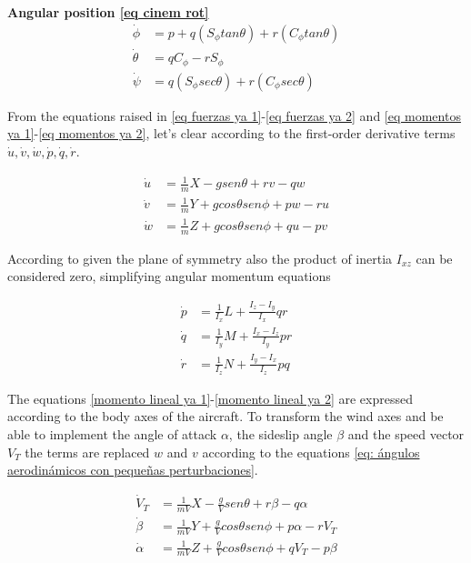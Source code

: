 \textbf{Angular position \ref{eq cinem rot}}
\begin{align}
\label{posi angular 1}
    \dot \phi &= p + q (S_{\phi} tan\theta) + r (C_{\phi} tan\theta)\\
    \dot \theta &=  qC_{\phi} - r S_{\phi}\\
    \dot \psi &= q (S_{\phi} sec\theta) + r (C_{\phi} sec\theta)
\label{posi angular 2}
\end{align}

From the equations raised in \ref{eq fuerzas ya 1}-\ref{eq fuerzas ya 2} and  \ref{eq momentos ya 1}-\ref{eq momentos ya 2}, let's clear according to the first-order derivative terms $\dot u, \dot v, \dot w, \dot p, \dot q, \dot r$.


\begin{align}
\label{momento lineal ya 1}
    \dot u &= \frac{1}{m}X - gsen\theta + rv - qw \\
    \dot v &= \frac{1}{m}Y + gcos\theta sen\phi + pw - ru \\
    \dot w &= \frac{1}{m}Z + gcos\theta sen\phi + qu - pv
\label{momento lineal ya 2}
\end{align}

According to \cite{Mohammad2020} given the plane of symmetry also the product of inertia $I_{xz}$ can be considered zero, simplifying angular momentum equations

\begin{align}
\label{moment angu 1 ya}
    \dot p &= \frac{1}{I_x}L + \frac{I_z - I_y}{I_x}qr \\
    \dot q &= \frac{1}{I_y}M  + \frac{I_x - I_z}{I_y}pr \\
    \dot r &= \frac{1}{I_z}N   + \frac{I_y - I_x}{I_z}pq
\label{moment angu 2 ya}
\end{align}

The equations \ref{momento lineal ya 1}-\ref{momento lineal ya 2} are expressed according to the body axes of the aircraft. To transform the wind axes and be able to implement the angle of attack $\alpha$, the sideslip angle $\beta$ and the speed vector $V_T$ the terms are replaced $w$ and $v$ according to the equations \ref{eq: ángulos aerodinámicos con pequeñas perturbaciones}. 

\begin{align}    
\label{aero 1 ya}
    \dot V_T &= \frac{1}{mV}X - \frac{g}{V} sen\theta + r\beta - q\alpha \\
    \dot \beta &= \frac{1}{mV}Y + \frac{g}{V} cos\theta sen\phi + p\alpha - r V_T \\
    \dot \alpha &= \frac{1}{mV}Z + \frac{g}{V} cos\theta sen\phi + q V_T - p\beta
\label{aero 2 ya}
\end{align}


